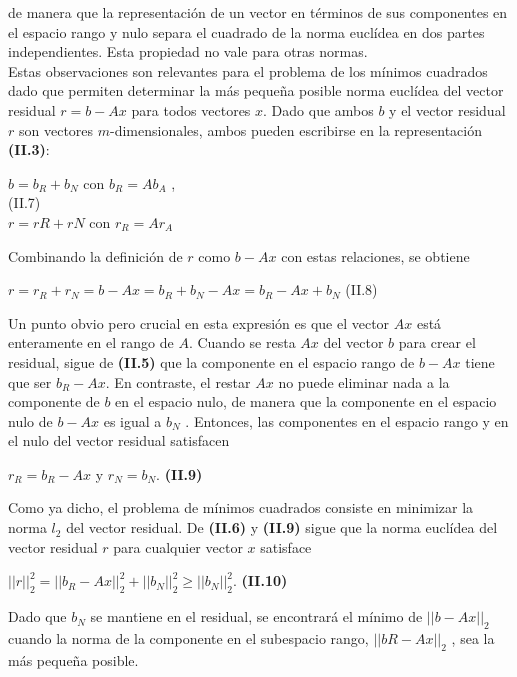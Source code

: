 \documentclass[twocolumn,twoside]{article}
\begin{document}
de manera que la representaci\'on de un vector en t\'erminos de sus componentes en el espacio
rango y nulo separa el cuadrado de la norma eucl\'idea en dos partes independientes. Esta
propiedad no vale para otras normas.\\
Estas observaciones son relevantes para el problema de los m\'inimos cuadrados dado
que permiten determinar la m\'as peque\~na posible norma eucl\'idea del vector residual $r =b - A x$ para
todos vectores $x$. Dado que ambos $b$ y el vector residual $r$ son vectores
$m$-dimensionales, ambos pueden escribirse en la representaci\'on \textbf{(II.3)}:
\begin{center}
 $ b = b_R + b_N$ con $b_R = Ab_A$ ,\\
             \hspace{6cm}   (II.7)\\
$r = r R + r N$ con $r_R = A r_A$ 

\end{center}

Combinando la definici\'on de $r$ como $b - A x$ con estas relaciones, se obtiene
\begin{center}
  $r = r_R + r_N = b - A x = b_R + b_N - A x= b_R - Ax + b_N$ \hspace{2cm}(II.8)
\end{center}

Un punto obvio pero crucial en esta expresi\'on es que el vector $A x$ est\'a enteramente en
el rango de $A$. Cuando se resta $A x$ del vector $b$ para crear el residual, sigue de \textbf{(II.5)}
que la componente en el espacio rango de $b - A x$ tiene que ser $b_R - A x$. En contraste,
el restar $A x$ no puede eliminar nada a la componente de $b$ en el espacio nulo, de manera
que la componente en el espacio nulo de $b-A x$ es igual a $b_N$ . Entonces, las componentes
en el espacio rango y en el nulo del vector residual satisfacen
\begin{center}
  $r_R = b_R - A x$ y $r_N = b_N$. \textbf{(II.9)}
\end{center}

Como ya dicho, el problema de m\'inimos cuadrados consiste en minimizar la norma $l_2$ del
vector residual. De \textbf{(II.6) }y \textbf{(II.9)} sigue que la norma eucl\'idea del vector 
residual $r$ para cualquier vector $x$ satisface
\begin{center}
  $||r||_2^2 = ||b_R - A x||_2^2 + ||b_N ||_2^2\geq ||b_N ||_2^2$. \textbf{(II.10)}
\end{center}

Dado que $b_N$ se mantiene en el residual, se encontrar\'a el m\'inimo de $||b - A x||_2$ cuando
la norma de la componente en el subespacio rango, $||b R - A x||_2$ , sea la m\'as peque\~na posible.
             
\end{document}
